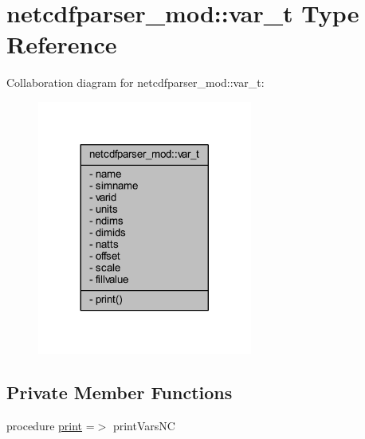 \hypertarget{structnetcdfparser__mod_1_1var__t}{}\section{netcdfparser\+\_\+mod\+:\+:var\+\_\+t Type Reference}
\label{structnetcdfparser__mod_1_1var__t}


Collaboration diagram for netcdfparser\+\_\+mod\+:\+:var\+\_\+t\+:\nopagebreak
\begin{figure}[H]
\begin{center}
\leavevmode
\includegraphics[width=200pt]{structnetcdfparser__mod_1_1var__t__coll__graph}
\end{center}
\end{figure}
\subsection*{Private Member Functions}
\begin{DoxyCompactItemize}
\item 
procedure \mbox{\hyperlink{structnetcdfparser__mod_1_1var__t_a0cd9a195dc76bda0993ee246474e9b08}{print}} =$>$ print\+Vars\+NC
\end{DoxyCompactItemize}
